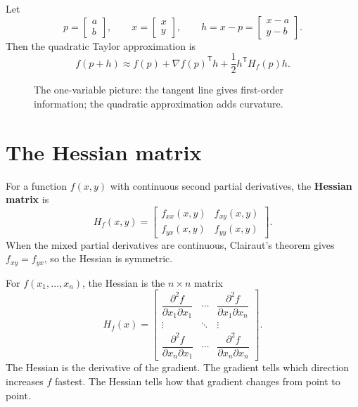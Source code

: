 \documentclass[11pt]{article}
\newcommand{\grad}{\nabla}
\newcommand{\T}{^{\mathsf T}}
\newcommand{\vect}[1]{\begin{bmatrix}#1\end{bmatrix}}
\begin{document}
\begin{tipbox}
Let
\[
p=\vect{a\\b},\qquad x=\vect{x\\y},\qquad h=x-p=\vect{x-a\\y-b}.
\]
Then the quadratic Taylor approximation is
\[
f(p+h)\approx f(p)+\grad f(p)\T h+\frac12h\T H_f(p)h.
\]
\end{tipbox}

\begin{figure}[H]
\centering
{}
\caption{The one-variable picture: the tangent line gives first-order information; the quadratic approximation adds curvature.}
\end{figure}

\section{The Hessian matrix}

For a function $f(x,y)$ with continuous second partial derivatives, the \textbf{Hessian matrix} is
\[
H_f(x,y)=
\begin{bmatrix}
f_{xx}(x,y) & f_{xy}(x,y)\\
f_{yx}(x,y) & f_{yy}(x,y)
\end{bmatrix}.
\]
When the mixed partial derivatives are continuous, Clairaut's theorem gives $f_{xy}=f_{yx}$, so the Hessian is symmetric.

For $f(x_1,\ldots,x_n)$, the Hessian is the $n\times n$ matrix
\[
H_f(x)=
\begin{bmatrix}
\dfrac{\partial^2 f}{\partial x_1\partial x_1} & \cdots & \dfrac{\partial^2 f}{\partial x_1\partial x_n}\\
\vdots & \ddots & \vdots\\
\dfrac{\partial^2 f}{\partial x_n\partial x_1} & \cdots & \dfrac{\partial^2 f}{\partial x_n\partial x_n}
\end{bmatrix}.
\]
The Hessian is the derivative of the gradient. The gradient tells which direction increases $f$ fastest. The Hessian tells how that gradient changes from point to point.
\end{document}
